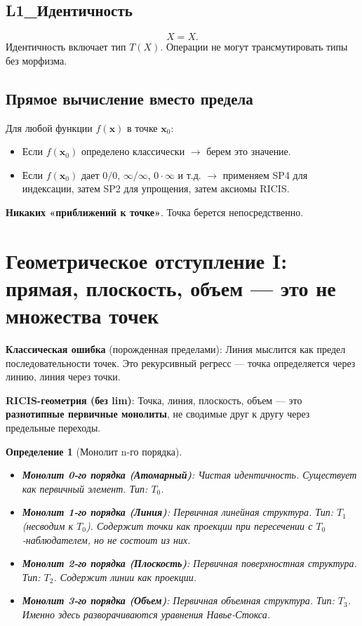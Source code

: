 \documentclass[12pt]{article}
\newtheorem{definition}{Определение}
\newcommand{\0}{\mathbf{0}}
\newcommand{\1}{\mathds{1}}
\newcommand{\bx}{\mathbf{x}}
\begin{document}
\subsection{L1\_Идентичность}
\[
X = X.
\]
Идентичность включает тип $T(X)$. Операции не могут трансмутировать типы без морфизма.

\subsection{Прямое вычисление вместо предела}
Для любой функции $f(\bx)$ в точке $\bx_0$:
\begin{itemize}
    \item Если $f(\bx_0)$ определено классически $\to$ берем это значение.
    \item Если $f(\bx_0)$ дает $0/0$, $\infty/\infty$, $0\cdot\infty$ и т.д. $\to$ применяем SP4 для индексации, затем SP2 для упрощения, затем аксиомы RICIS.
\end{itemize}
\textbf{Никаких «приближений к точке»}. Точка берется непосредственно.

\section{Геометрическое отступление I: прямая, плоскость, объем --- это не множества точек}

\textbf{Классическая ошибка} (порожденная пределами): Линия мыслится как предел последовательности точек. Это рекурсивный регресс --- точка определяется через линию, линия через точки.

\textbf{RICIS-геометрия (без lim)}: Точка, линия, плоскость, объем --- это \textbf{разнотипные первичные монолиты}, не сводимые друг к другу через предельные переходы.

\begin{definition}[Монолит n-го порядка]
\begin{itemize}
    \item \textbf{Монолит 0-го порядка (Атомарный)}: Чистая идентичность. Существует как первичный элемент. Тип: $T_0$.
    \item \textbf{Монолит 1-го порядка (Линия)}: Первичная линейная структура. Тип: $T_1$ (несводим к $T_0$). Содержит точки как \textit{проекции} при пересечении с $T_0$-наблюдателем, но не состоит из них.
    \item \textbf{Монолит 2-го порядка (Плоскость)}: Первичная поверхностная структура. Тип: $T_2$. Содержит линии как проекции.
    \item \textbf{Монолит 3-го порядка (Объем)}: Первичная объемная структура. Тип: $T_3$. Именно здесь разворачиваются уравнения Навье-Стокса.
\end{itemize}
\end{definition}
\end{document}
